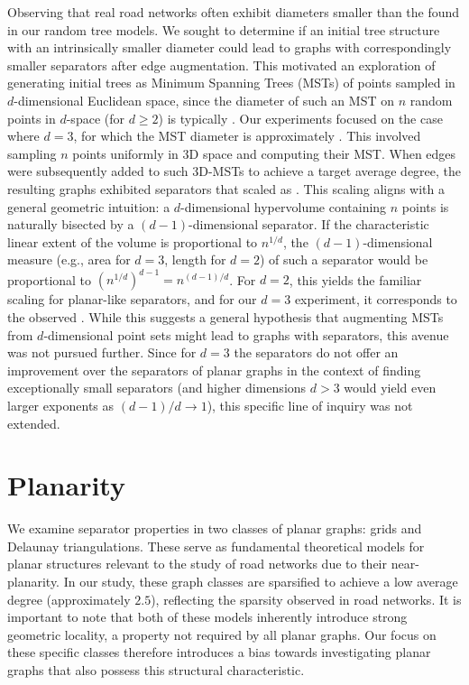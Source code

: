 Observing that real road networks often exhibit diameters smaller than the  found in our random tree models.
We sought to determine if an initial tree structure with an intrinsically smaller diameter could lead to graphs with correspondingly smaller separators after edge augmentation.
This motivated an exploration of generating initial trees as Minimum Spanning Trees (MSTs) of points sampled in \(d\)-dimensional Euclidean space, since the diameter of such an MST on \(n\) random points in \(d\)-space (for \(d \ge 2\)) is typically .
Our experiments focused on the case where \(d=3\), for which the MST diameter is approximately .
This involved sampling \(n\) points uniformly in 3D space and computing their MST.
When edges were subsequently added to such 3D-MSTs to achieve a target average degree, the resulting graphs exhibited separators that scaled as .
This scaling aligns with a general geometric intuition: a \(d\)-dimensional hypervolume containing \(n\) points is naturally bisected by a \((d-1)\)-dimensional separator.
If the characteristic linear extent of the volume is proportional to \(n^{1/d}\), the \((d-1)\)-dimensional measure (e.g., area for \(d=3\), length for \(d=2\)) of such a separator would be proportional to \((n^{1/d})^{d-1} = n^{(d-1)/d}\).
For \(d=2\), this yields the familiar  scaling for planar-like separators, and for our \(d=3\) experiment, it corresponds to the observed .
While this suggests a general hypothesis that augmenting MSTs from \(d\)-dimensional point sets might lead to graphs with  separators, this avenue was not pursued further.
Since for \(d=3\) the  separators do not offer an improvement over the  separators of planar graphs in the context of finding exceptionally small separators (and higher dimensions \(d > 3\) would yield even larger exponents as \((d-1)/d \to 1\)), this specific line of inquiry was not extended.

\section{Planarity}
\label{sec:synthetic:planarity}

We examine separator properties in two classes of planar graphs: grids and Delaunay triangulations.
These serve as fundamental theoretical models for planar structures relevant to the study of road networks due to their near-planarity.
In our study, these graph classes are sparsified to achieve a low average degree (approximately \(2.5\)), reflecting the sparsity observed in road networks.
It is important to note that both of these models inherently introduce strong geometric locality, a property not required by all planar graphs.
Our focus on these specific classes therefore introduces a bias towards investigating planar graphs that also possess this structural characteristic.

